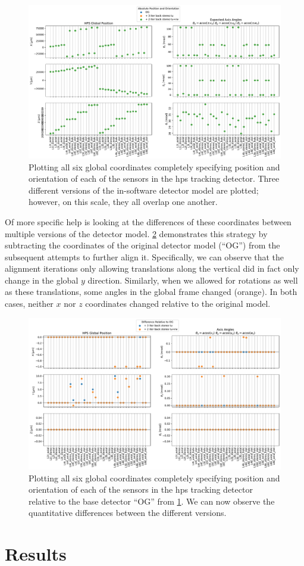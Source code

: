 \begin{figure}
	\centering
	\includegraphics[width=\textwidth]{figures/hps/alignment/example-det-vis-abs.pdf}
	\caption{Plotting all six global coordinates completely specifying position and orientation
	of each of the sensors in the \ac{hps} tracking detector. Three different versions of the
	in-software detector model are plotted; however, on this scale, they all overlap one another.}
	\label{fig:example-det-vis-abs}
\end{figure}

Of more specific help is looking at the differences of these coordinates between
multiple versions of the detector model. \cref{fig:example-det-vis-diff} demonstrates
this strategy by subtracting the coordinates of the original detector model (``OG'')
from the subsequent attempts to further align it. Specifically, we can observe that
the alignment iterations only allowing translations along the vertical did in fact
only change in the global $y$ direction. Similarly, when we allowed for rotations as
well as these translations, some angles in the global frame changed (orange).
In both cases, neither $x$ nor $z$ coordinates changed relative to the original model.

\begin{figure}
	\centering
	\includegraphics[width=\textwidth]{figures/hps/alignment/example-det-vis-diff.pdf}
	\caption{Plotting all six global coordinates completely specifying position and
	orientation of each of the sensors in the \ac{hps} tracking detector relative to
	the base detector ``OG'' from \cref{fig:example-det-vis-abs}. We can now observe
	the quantitative differences between the different versions.}
	\label{fig:example-det-vis-diff}
\end{figure}

\section{Results}
